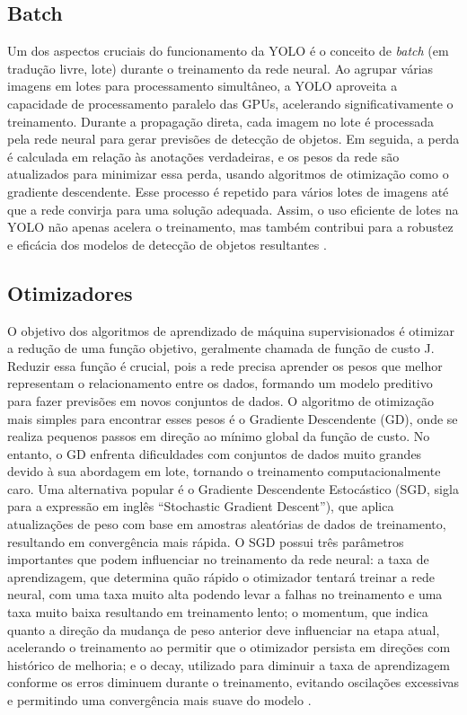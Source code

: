 \subsection{Batch}
\label{sec:batch}

Um dos aspectos cruciais do funcionamento da YOLO é o conceito de \textit{batch} (em tradução livre, lote) durante o treinamento da rede neural. Ao agrupar várias imagens em lotes para processamento simultâneo, a YOLO aproveita a capacidade de processamento paralelo das GPUs, acelerando significativamente o treinamento. Durante a propagação direta, cada imagem no lote é processada pela rede neural para gerar previsões de detecção de objetos. Em seguida, a perda é calculada em relação às anotações verdadeiras, e os pesos da rede são atualizados para minimizar essa perda, usando algoritmos de otimização como o gradiente descendente. Esse processo é repetido para vários lotes de imagens até que a rede convirja para uma solução adequada. Assim, o uso eficiente de lotes na YOLO não apenas acelera o treinamento, mas também contribui para a robustez e eficácia dos modelos de detecção de objetos resultantes \cite{goodfellow2016deep}.

\subsection{Otimizadores}
\label{sec:otimizadores}

O objetivo dos algoritmos de aprendizado de máquina supervisionados é otimizar a redução de uma função objetivo, geralmente chamada de função de custo J. Reduzir essa função é crucial, pois a rede precisa aprender os pesos que melhor representam o relacionamento entre os dados, formando um modelo preditivo para fazer previsões em novos conjuntos de dados. O algoritmo de otimização mais simples para encontrar esses pesos é o Gradiente Descendente (GD), onde se realiza pequenos passos em direção ao mínimo global da função de custo. No entanto, o GD enfrenta dificuldades com conjuntos de dados muito grandes devido à sua abordagem em lote, tornando o treinamento computacionalmente caro. Uma alternativa popular é o Gradiente Descendente Estocástico (SGD, sigla para a expressão em inglês “Stochastic Gradient Descent”), que aplica atualizações de peso com base em amostras aleatórias de dados de treinamento, resultando em convergência mais rápida. O  SGD possui três parâmetros importantes que podem influenciar no treinamento da rede neural: a taxa de aprendizagem, que determina quão rápido o otimizador tentará treinar a rede neural, com uma taxa muito alta podendo levar a falhas no treinamento e uma taxa muito baixa resultando em treinamento lento; o momentum, que indica quanto a direção da mudança de peso anterior deve influenciar na etapa atual, acelerando o treinamento ao permitir que o otimizador persista em direções com histórico de melhoria; e o decay, utilizado para diminuir a taxa de aprendizagem conforme os erros diminuem durante o treinamento, evitando oscilações excessivas e permitindo uma convergência mais suave do modelo \cite{silva2018estudo}.


